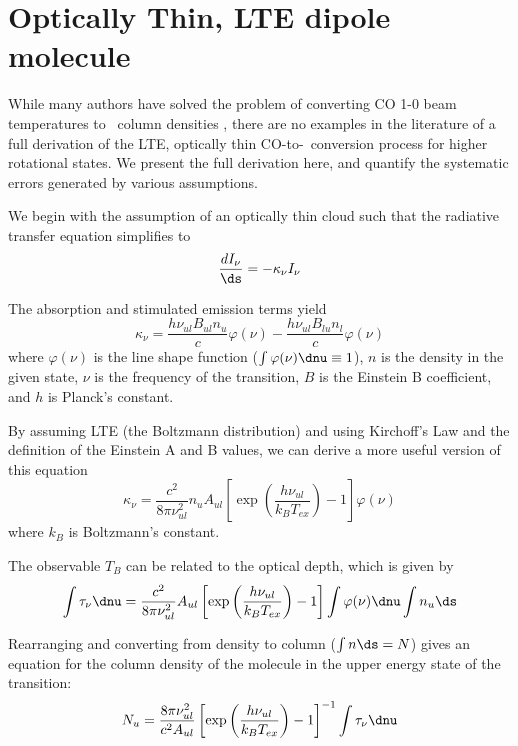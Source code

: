 \appendix
\onecolumn
\section{Optically Thin, LTE dipole molecule}
\label{appendix:dipole}
While many authors have solved the problem of converting CO 1-0 beam
temperatures to \hh\ column densities
\citep{garden1991,bourke1997,Cabrit1990,lada1996}, there are no  examples in
the literature of a full derivation of the LTE, optically thin CO-to-\hh\
conversion process for higher rotational states.  We present the full
derivation here, and quantify the systematic errors generated by various
assumptions.

We begin with the assumption of an optically thin cloud such that the radiative
transfer equation \citep[][eqn 1.9]{rohlfs} simplifies to
\begin{equation}
  \label{eqn:radtrans}
  \frac{dI_\nu}{\ds} = -\kappa_\nu I_\nu 
\end{equation}

The absorption and stimulated emission terms yield 
\begin{equation}
  \label{eqn:kappa}
  \kappa_\nu = \frac{h \nu_{ul} B_{ul} n_u}{c} \varphi(\nu)
              -\frac{h \nu_{ul} B_{lu} n_l}{c} \varphi(\nu)
\end{equation}
where $\varphi(\nu)$ is the line shape function ($\int\varphi(\nu) \dnu \equiv
1$), $n$ is the density in the given state, $\nu$ is the frequency of the transition,
$B$ is the Einstein B coefficient, and $h$ is Planck's constant.

By assuming LTE (the Boltzmann distribution) and using Kirchoff's Law and the definition of 
the Einstein A and B values, we can derive a more useful version of this equation
\begin{equation}
  \kappa_\nu = \frac{c^2}{8 \pi \nu_{ul}^2} n_u A_{ul} \left[\exp\left(\frac{h \nu_{ul} }{k_B T_{ex}}\right) - 1 \right] \varphi(\nu)
\end{equation}
where $k_B$ is Boltzmann's constant.

The observable $T_B$ can be related to the optical depth, which is given by 
\begin{equation}
  \int \tau_\nu \dnu = \frac{c^2}{8 \pi \nu_{ul}^2} A_{ul} \left[\exp\left(\frac{h \nu_{ul} }{k_B T_{ex}}\right) - 1 \right] \int \varphi(\nu) \dnu \int n_u \ds 
\end{equation}

Rearranging and converting from density to column ($\int n \ds = N$) gives an equation for the column density
of the molecule in the upper energy state of the transition:
\begin{equation}
  \label{eqn:nuppertau}
  N_u = \frac{8\pi \nu_{ul}^2}{c^2 A_{ul}} \left[\exp\left(\frac{h \nu_{ul} }{k_B T_{ex}}\right) - 1 \right]^{-1} \int \tau_\nu \dnu
\end{equation}

